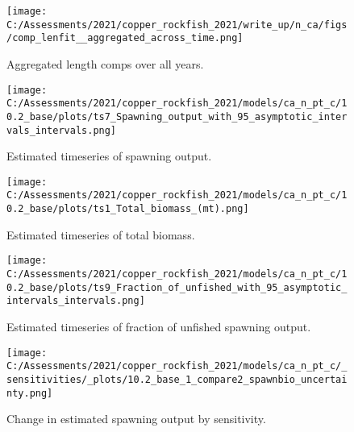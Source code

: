 \documentclass[11pt,
  english,
  a4paper,
]{article}
\begin{document}
\begin{figure}
\centering
\texttt{[image: C:/Assessments/2021/copper\_rockfish\_2021/write\_up/n\_ca/figs/comp\_lenfit\_\_aggregated\_across\_time.png]}
\caption{Aggregated length comps over all years.\label{fig:agg-len-fit}}
\end{figure}

\tagmcend\tagstructend


\begin{figure}
\centering
\texttt{[image: C:/Assessments/2021/copper\_rockfish\_2021/models/ca\_n\_pt\_c/10.2\_base/plots/ts7\_Spawning\_output\_with\_95\_asymptotic\_intervals\_intervals.png]}
\caption{Estimated timeseries of spawning output.\label{fig:ssb}}
\end{figure}

\tagmcend\tagstructend


\begin{figure}
\centering
\texttt{[image: C:/Assessments/2021/copper\_rockfish\_2021/models/ca\_n\_pt\_c/10.2\_base/plots/ts1\_Total\_biomass\_(mt).png]}
\caption{Estimated timeseries of total biomass.\label{fig:tot-bio}}
\end{figure}

\tagmcend\tagstructend


\begin{figure}
\centering
\texttt{[image: C:/Assessments/2021/copper\_rockfish\_2021/models/ca\_n\_pt\_c/10.2\_base/plots/ts9\_Fraction\_of\_unfished\_with\_95\_asymptotic\_intervals\_intervals.png]}
\caption{Estimated timeseries of fraction of unfished spawning output.\label{fig:depl}}
\end{figure}

\tagmcend\tagstructend


\begin{figure}
\centering
\texttt{[image: C:/Assessments/2021/copper\_rockfish\_2021/models/ca\_n\_pt\_c/\_sensitivities/\_plots/10.2\_base\_1\_compare2\_spawnbio\_uncertainty.png]}
\caption{Change in estimated spawning output by sensitivity.\label{fig:sens-ssb-1}}
\end{figure}
\end{document}
